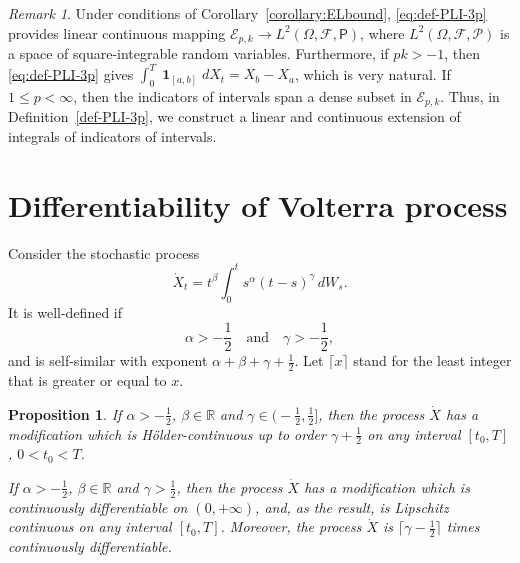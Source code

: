 \documentclass{article}
\DeclareMathOperator{\indicatorfun}{\mathbf{1}}
\newcommand{\dotX}{\dot{X}}
\theoremstyle{plain}
\newtheorem{prop}{Proposition}
\theoremstyle{remark}
\newtheorem{remark}{Remark}
\theoremstyle{definition}
\begin{document}
\begin{remark}\label{rem:just-def-PLI-3p}
 Under conditions of Corollary~\ref{corollary:ELbound},
\eqref{eq:def-PLI-3p} provides linear continuous
mapping $\mathcal{E}_{p,k} \to L^2(\Omega,\mathcal{F},\mathsf{P})$,
where $L^2(\Omega,\mathcal{F},\mathcal{P})$
is a space of square-integrable random variables.
Furthermore, if $p k\mathbin{>} {-}1$,
then \eqref{eq:def-PLI-3p}
gives $\int_0^T \indicatorfun_{[a,b]} dX_t = X_b - X_a$,
which is very natural.
If $1\mathbin{\le}p\mathbin{<}\infty$,
then the indicators of intervals span a dense subset
in $\mathcal{E}_{p,k}$.
Thus, in Definition~\ref{def-PLI-3p},
we construct a linear and continuous extension
of integrals of indicators of intervals.
\end{remark}

\section{Differentiability of Volterra process}
Consider the stochastic process
\begin{equation}\label{eq:dotXdef}
\dotX _t = t^\beta \int_0^t s^\alpha (t-s)^\gamma \, dW_s .
\end{equation}
It is well-defined if
\[
\alpha>-\frac{1}{2} \quad \mbox{and}  \quad
\gamma>-\frac{1}{2},
\]
and
is self-similar with exponent $\alpha+\beta+\gamma+\frac12$.
Let  $\lceil x \rceil$ stand for 
  the least integer that is greater   or equal to $x$.

\begin{prop}
If $\alpha>-\frac{1}{2}$, $\beta\in\mathbb{R}$
and $\gamma\in\bigl(-\frac12, \frac12\bigr]$,
then the process $\dotX$ has a modification
which is H\"older-continuous
up to order $\gamma+\frac12$ on any interval $[t_0, T]$,
$0<t_0<T$.


If $\alpha>-\frac{1}{2}$, $\beta\in\mathbb{R}$
and $\gamma>\frac12$, then the process
$\dotX$ has a modification
which is continuously differentiable on $(0,+\infty)$,
and, as the result, is Lipschitz continuous
on any interval $[t_0,T]$.
Moreover, the process $\dotX$ is $\lceil \gamma-\frac12 \rceil$
times continuously differentiable. 
\end{prop}
\end{document}
